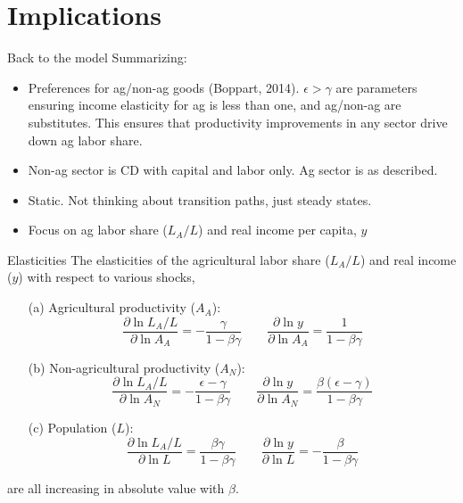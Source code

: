 \documentclass[10pt, xcolor=dvipsnames]{beamer}
\begin{document}
\section{Implications}

\begin{frame}{Back to the model}\label{extend}
Summarizing:
\begin{itemize}
  \item Preferences for ag/non-ag goods (Boppart, 2014). $\epsilon > \gamma$ are parameters ensuring income elasticity for ag is less than one, and ag/non-ag are substitutes. This ensures that productivity improvements in any sector drive down ag labor share.
  \item Non-ag sector is CD with capital and labor only. Ag sector is as described.
  \item Static. Not thinking about transition paths, just steady states.
  \item Focus on ag labor share ($L_A/L$) and real income per capita, $y$
\end{itemize}

\end{frame}

\begin{frame}{Elasticities}
The elasticities of the agricultural labor share ($L_A/L$) and real income ($y$) with respect to various shocks,
\begin{enumerate}
  \item[(a)] Agricultural productivity ($A_A$): 
\begin{equation}
  \frac{\partial \ln L_A/L}{\partial \ln A_A} = - \frac{\gamma}{1-\beta\gamma} \quad \quad \frac{\partial \ln y}{\partial \ln A_A} = \frac{1}{1-\beta\gamma}
\end{equation}
  \item[(b)] Non-agricultural productivity ($A_N$): 
\begin{equation}
  \frac{\partial \ln L_A/L}{\partial \ln A_N} = - \frac{\epsilon-\gamma}{1-\beta\gamma} \quad \quad \frac{\partial \ln y}{\partial \ln A_N} = \frac{\beta(\epsilon-\gamma)}{1-\beta\gamma}
\end{equation}
  \item[(c)] Population ($L$): 
\begin{equation}
  \frac{\partial \ln L_A/L}{\partial \ln L} = \frac{\beta\gamma}{1-\beta\gamma} \quad \quad \frac{\partial \ln y}{\partial \ln L} = - \frac{\beta}{1-\beta\gamma}
\end{equation}
\end{enumerate}
are all increasing in absolute value with $\beta$.
\end{frame}
\end{document}
